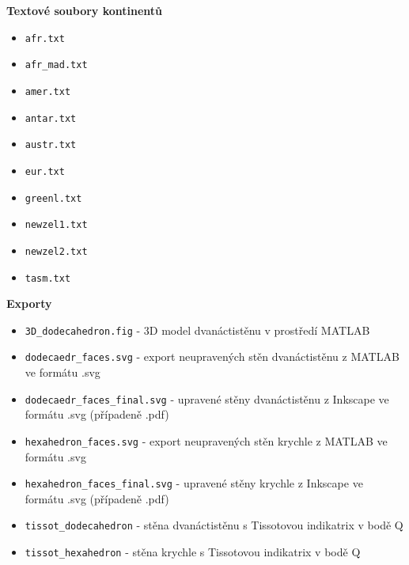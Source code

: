 \documentclass[12pt, a4paper]{article}
\begin{document}
\textbf{Textové soubory kontinentů}

\begin{itemize}
    \item \texttt{afr.txt}
    \item \texttt{afr\_mad.txt}
    \item \texttt{amer.txt}
    \item \texttt{antar.txt}
    \item \texttt{austr.txt}
    \item \texttt{eur.txt}
    \item \texttt{greenl.txt}
    \item \texttt{newzel1.txt}
    \item \texttt{newzel2.txt}
    \item \texttt{tasm.txt}
\end{itemize}

\textbf{Exporty}

\begin{itemize}
    \item \texttt{3D\_dodecahedron.fig} - 3D model dvanáctistěnu v prostředí MATLAB
    \item \texttt{dodecaedr\_faces.svg} - export neupravených stěn dvanáctistěnu z MATLAB ve formátu .svg
    \item \texttt{dodecaedr\_faces\_final.svg} - upravené stěny dvanáctistěnu z Inkscape ve formátu .svg (případeně .pdf)
    \item \texttt{hexahedron\_faces.svg} - export neupravených stěn krychle z MATLAB ve formátu .svg
    \item \texttt{hexahedron\_faces\_final.svg} - upravené stěny krychle z Inkscape ve formátu .svg (případeně .pdf)
    \item \texttt{tissot\_dodecahedron} - stěna dvanáctistěnu s Tissotovou indikatrix v bodě Q
    \item \texttt{tissot\_hexahedron} - stěna krychle s Tissotovou indikatrix v bodě Q
\end{itemize}

\printbibliography[title=Zdroje]
\end{document}

